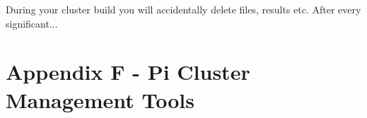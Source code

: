 \documentclass{article}
\begin{document}
During your cluster build you will accidentally delete files, results etc. After every significant...


%
%
\clearpage\section{Appendix F - Pi Cluster Management Tools}










%
%
\end{document}
